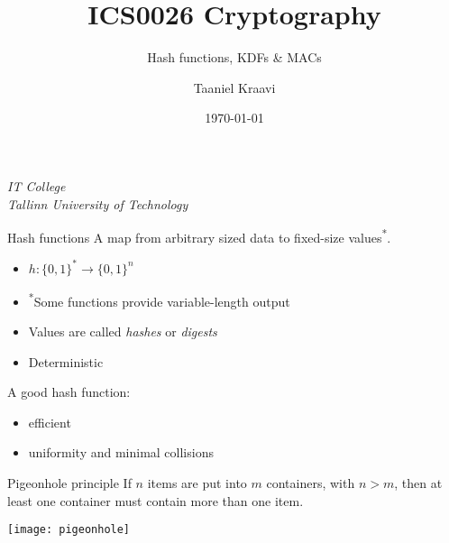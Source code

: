 \graphicspath{ {../../images/} }
\usetikzlibrary{external}

\usepackage{fancyvrb}

\usepackage[dvipsnames]{xcolor}

\setmonofont{cmuntt}

\title{ICS0026 Cryptography}
\subtitle{Hash functions, KDFs \& MACs}
\date{\today}
\author{Taaniel Kraavi}
\institute%
{%
  \textit{IT College}\\
  \textit{Tallinn University of Technology}
}


\begin{frame}
  \titlepage
\end{frame}

\begin{frame}{Hash functions}
  \pause
  A map from arbitrary sized data to fixed-size values\textsuperscript{*}.
  \begin{itemize}[<+(1)->]
    \item $h:\{0,1\}^* \to \{0,1\}^n$
    \item \textsuperscript{*}Some functions provide variable-length output
    \item Values are called \emph{hashes} or \emph{digests}
    \item Deterministic
  \end{itemize}

  \vspace*{1em}

  \pause
  A good hash function:
  \begin{itemize}[<+(1)->]
    \item efficient
    \item uniformity and minimal collisions
  \end{itemize}
\end{frame}

\begin{frame}{Pigeonhole principle}
  \pause
  If $n$ items are put into $m$ containers, with $n > m$, then at least one container must contain more than one item.

  \vspace*{1em}

  \pause
  \begin{center}
    \texttt{[image: pigeonhole]}
  \end{center}
\end{frame}

